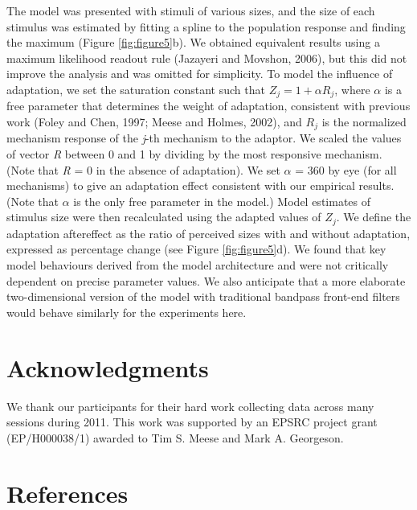 \documentclass[
]{article}
\begin{document}
The model was presented with stimuli of various sizes, and the size of each stimulus was estimated by fitting a spline to the population response and finding the maximum (Figure \ref{fig:figure5}b). We obtained equivalent results using a maximum likelihood readout rule (Jazayeri and Movshon, 2006), but this did not improve the analysis and was omitted for simplicity. To model the influence of adaptation, we set the saturation constant such that \(Z_j = 1 + \alpha R_j\), where \(\alpha\) is a free parameter that determines the weight of adaptation, consistent with previous work (Foley and Chen, 1997; Meese and Holmes, 2002), and \(R_j\) is the normalized mechanism response of the \emph{j}-th mechanism to the adaptor. We scaled the values of vector \emph{R} between 0 and 1 by dividing by the most responsive mechanism. (Note that \emph{R} = 0 in the absence of adaptation). We set \(\alpha\) = 360 by eye (for all mechanisms) to give an adaptation effect consistent with our empirical results. (Note that \(\alpha\) is the only free parameter in the model.) Model estimates of stimulus size were then recalculated using the adapted values of \(Z_j\). We define the adaptation aftereffect as the ratio of perceived sizes with and without adaptation, expressed as percentage change (see Figure \ref{fig:figure5}d). We found that key model behaviours derived from the model architecture and were not critically dependent on precise parameter values. We also anticipate that a more elaborate two-dimensional version of the model with traditional bandpass front-end filters would behave similarly for the experiments here.

\hypertarget{acknowledgments}{%
\section*{Acknowledgments}\label{acknowledgments}}

We thank our participants for their hard work collecting data across many sessions during 2011. This work was supported by an EPSRC project grant (EP/H000038/1) awarded to Tim S. Meese and Mark A. Georgeson.

\hypertarget{references}{%
\section*{References}\label{references}}
\end{document}
